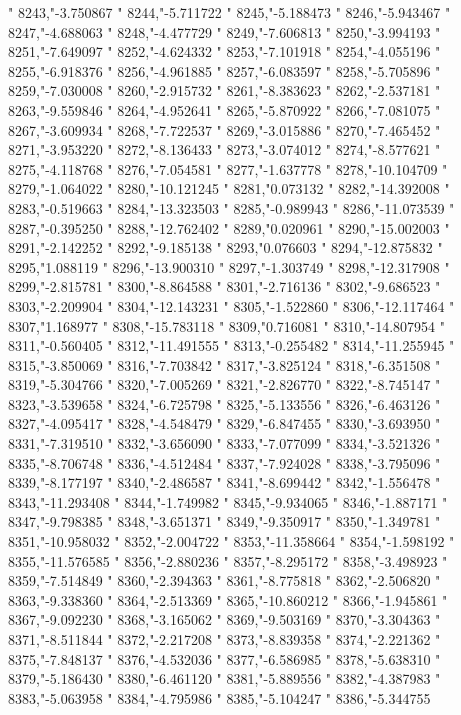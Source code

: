 "
8243,"-3.750867
"
8244,"-5.711722
"
8245,"-5.188473
"
8246,"-5.943467
"
8247,"-4.688063
"
8248,"-4.477729
"
8249,"-7.606813
"
8250,"-3.994193
"
8251,"-7.649097
"
8252,"-4.624332
"
8253,"-7.101918
"
8254,"-4.055196
"
8255,"-6.918376
"
8256,"-4.961885
"
8257,"-6.083597
"
8258,"-5.705896
"
8259,"-7.030008
"
8260,"-2.915732
"
8261,"-8.383623
"
8262,"-2.537181
"
8263,"-9.559846
"
8264,"-4.952641
"
8265,"-5.870922
"
8266,"-7.081075
"
8267,"-3.609934
"
8268,"-7.722537
"
8269,"-3.015886
"
8270,"-7.465452
"
8271,"-3.953220
"
8272,"-8.136433
"
8273,"-3.074012
"
8274,"-8.577621
"
8275,"-4.118768
"
8276,"-7.054581
"
8277,"-1.637778
"
8278,"-10.104709
"
8279,"-1.064022
"
8280,"-10.121245
"
8281,"0.073132
"
8282,"-14.392008
"
8283,"-0.519663
"
8284,"-13.323503
"
8285,"-0.989943
"
8286,"-11.073539
"
8287,"-0.395250
"
8288,"-12.762402
"
8289,"0.020961
"
8290,"-15.002003
"
8291,"-2.142252
"
8292,"-9.185138
"
8293,"0.076603
"
8294,"-12.875832
"
8295,"1.088119
"
8296,"-13.900310
"
8297,"-1.303749
"
8298,"-12.317908
"
8299,"-2.815781
"
8300,"-8.864588
"
8301,"-2.716136
"
8302,"-9.686523
"
8303,"-2.209904
"
8304,"-12.143231
"
8305,"-1.522860
"
8306,"-12.117464
"
8307,"1.168977
"
8308,"-15.783118
"
8309,"0.716081
"
8310,"-14.807954
"
8311,"-0.560405
"
8312,"-11.491555
"
8313,"-0.255482
"
8314,"-11.255945
"
8315,"-3.850069
"
8316,"-7.703842
"
8317,"-3.825124
"
8318,"-6.351508
"
8319,"-5.304766
"
8320,"-7.005269
"
8321,"-2.826770
"
8322,"-8.745147
"
8323,"-3.539658
"
8324,"-6.725798
"
8325,"-5.133556
"
8326,"-6.463126
"
8327,"-4.095417
"
8328,"-4.548479
"
8329,"-6.847455
"
8330,"-3.693950
"
8331,"-7.319510
"
8332,"-3.656090
"
8333,"-7.077099
"
8334,"-3.521326
"
8335,"-8.706748
"
8336,"-4.512484
"
8337,"-7.924028
"
8338,"-3.795096
"
8339,"-8.177197
"
8340,"-2.486587
"
8341,"-8.699442
"
8342,"-1.556478
"
8343,"-11.293408
"
8344,"-1.749982
"
8345,"-9.934065
"
8346,"-1.887171
"
8347,"-9.798385
"
8348,"-3.651371
"
8349,"-9.350917
"
8350,"-1.349781
"
8351,"-10.958032
"
8352,"-2.004722
"
8353,"-11.358664
"
8354,"-1.598192
"
8355,"-11.576585
"
8356,"-2.880236
"
8357,"-8.295172
"
8358,"-3.498923
"
8359,"-7.514849
"
8360,"-2.394363
"
8361,"-8.775818
"
8362,"-2.506820
"
8363,"-9.338360
"
8364,"-2.513369
"
8365,"-10.860212
"
8366,"-1.945861
"
8367,"-9.092230
"
8368,"-3.165062
"
8369,"-9.503169
"
8370,"-3.304363
"
8371,"-8.511844
"
8372,"-2.217208
"
8373,"-8.839358
"
8374,"-2.221362
"
8375,"-7.848137
"
8376,"-4.532036
"
8377,"-6.586985
"
8378,"-5.638310
"
8379,"-5.186430
"
8380,"-6.461120
"
8381,"-5.889556
"
8382,"-4.387983
"
8383,"-5.063958
"
8384,"-4.795986
"
8385,"-5.104247
"
8386,"-5.344755
